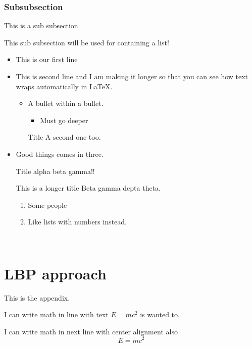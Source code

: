\documentclass{article}
\begin{document}

\subsubsection{Subsubsection}\cite{ref:Spoof_two}
This is a sub subsection.

This sub subsection will be used for containing a list!

\begin{itemize}
	\item This is our first line
	\item This is second line and I am making it longer so that you can see how text wraps automatically in LaTeX.
	\begin{itemize}
		\item A bullet within a bullet.
			\begin{itemize}
				\item Must go deeper
			\end{itemize}
		\item[Title] A second one too. %
 	\end{itemize}
	\item Good things comes in three.
	\item [Title] alpha beta gamma!!
	\item[This is a longer title] Beta gamma depta theta. 
		\begin{enumerate} %
			\item Some people
			\item Like lists with numbers instead.
		\end{enumerate}
\end{itemize}


\cleardoublepage

\cleardoublepage\

\appendix
\section{LBP approach}
This is the appendix.

I can write math in line with text $E = mc^2$ is wanted to.

I can write math in next line with center alignment also  $$E = mc^2$$ 
\end{document}
